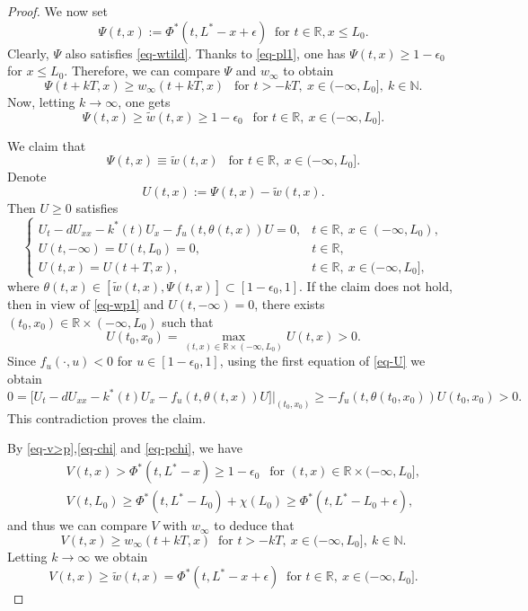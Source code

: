 \documentclass[11pt]{amsart}
\numberwithin{equation}{section}
\begin{document}
\begin{proof}
We now set 
$$\Psi(t,x):=\Phi^*(t,L^*-x+\epsilon) ~\text{ for }t\in\mathbb R, x\leq L_0.$$
Clearly, $\Psi$ also satisfies \eqref{eq-wtild}. Thanks to \eqref{eq-pl1}, one has $\Psi(t,x)\geq 1-\epsilon_0$ for $x\leq L_0$. Therefore, we can compare $\Psi$ and $w_\infty$  to obtain
\begin{equation*}
  \Psi(t+kT,x)\geq  w_\infty(t+kT,x)~~\text{ for } t>-kT,\  x\in(-\infty,L_0],\  k\in\mathbb N.
\end{equation*}
Now, letting $k\to\infty$, one gets
\begin{equation}\label{eq-wp1}
  \Psi(t,x)\geq \tilde{w}(t,x)\geq 1-\epsilon_0~~\text{ for }t\in\mathbb{R},\ x\in(-\infty,L_0].
\end{equation}

We claim that 
\begin{equation*}
  \Psi(t,x)\equiv \tilde{w}(t,x)~~ \text{ for }t\in\mathbb{R},\  x\in(-\infty,L_0].
\end{equation*}
Denote
\begin{equation*}
  U(t,x):=\Psi(t,x)-\tilde{w}(t,x).
\end{equation*}
Then $U\geq 0$ satisfies 
\begin{equation}\label{eq-U}\begin{cases}
  U_t-dU_{xx}-k^*(t)U_x-f_u(t,\theta(t,x))U=0,&t\in\mathbb{R},\  x\in(-\infty,L_0),\\
  U(t,-\infty)=U(t,L_0)=0,&t\in\mathbb{R},\\
  U(t,x)=U(t+T,x), &t\in\mathbb{R},\ x\in(-\infty, L_0],
\end{cases}
\end{equation}
where $\theta(t,x)\in[\tilde{w}(t,x),\Psi(t,x)]\subset[1-\epsilon_0,1]$.
If the claim does not hold, then in view of \eqref{eq-wp1} and $U(t,-\infty)=0$, there exists $(t_0,x_0)\in\mathbb{R}\times(-\infty,L_0)$ such that 
$$U(t_0,x_0)=\max_{(t,x)\in\mathbb{R}\times(-\infty,L_0)}U(t,x)>0.$$
Since  $f_u(\cdot,u)<0$ for $u\in[1-\epsilon_0,1]$, using the first equation of \eqref{eq-U} we obtain
\begin{equation*}
  0=\big[U_t-dU_{xx}-k^*(t)U_x-f_u(t,\theta(t,x))U\big]\big|_{(t_0,x_0)}\geq -f_u(t,\theta(t_0,x_0))U(t_0,x_0)>0.
\end{equation*}
This contradiction proves the claim.

By \eqref{eq-v>p},\eqref{eq-chi} and \eqref{eq-pchi}, we have
\begin{eqnarray*}
  &&V(t,x)> \Phi^*(t,L^*-x)\geq 1-\epsilon_0 ~~\text{ for } (t,x)\in\mathbb R \times(-\infty,L_0],\\
  && V(t,L_0)\geq \Phi^*(t,L^*-L_0)+\chi (L_0)\geq  \Phi^*(t,L^*-L_0+\epsilon),
\end{eqnarray*}
 and thus we can compare $V$ with $w_\infty$  to deduce that 
\[ V(t,x)\geq w_\infty(t+kT,x)~\text{ for }t>-kT,\ x\in(-\infty,L_0],\  k\in\mathbb N.\]
Letting $k\to\infty$ we obtain 
\begin{equation}\label{eq-vw}
  V(t,x)\geq \tilde{w}(t,x)=\Phi^*(t,L^*-x+\epsilon) ~\text{ for }t\in\mathbb R,\ x\in(-\infty,L_0].
\end{equation}


\end{proof}
\end{document}
